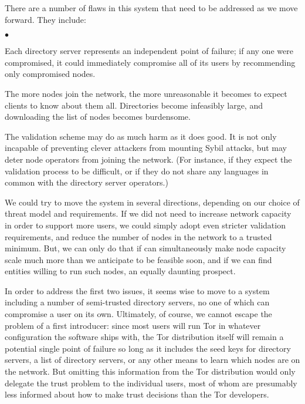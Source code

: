 \documentclass{llncs}
\newenvironment{tightlist}{\begin{list}{$\bullet$}{
  \setlength{\itemsep}{0mm}
    \setlength{\parsep}{0mm}
    }}{\end{list}}
\begin{document}
There are a number of flaws in this system that need to be addressed as we
move forward.  They include:
\begin{tightlist}
\item Each directory server represents an independent point of failure; if
  any one were compromised, it could immediately compromise all of its users
  by recommending only compromised nodes.
\item The more nodes join the network, the more unreasonable it
  becomes to expect clients to know about them all.  Directories
  become infeasibly large, and downloading the list of nodes becomes
  burdensome.
\item The validation scheme may do as much harm as it does good.  It is not
  only incapable of preventing clever attackers from mounting Sybil attacks,
  but may deter node operators from joining the network.  (For instance, if
  they expect the validation process to be difficult, or if they do not share
  any languages in common with the directory server operators.)
\end{tightlist}

We could try to move the system in several directions, depending on our
choice of threat model and requirements.  If we did not need to increase
network capacity in order to support more users, we could simply
 adopt even stricter validation requirements, and reduce the number of
nodes in the network to a trusted minimum.  
But, we can only do that if can simultaneously make node capacity
scale much more than we anticipate to be feasible soon, and if we can find
entities willing to run such nodes, an equally daunting prospect.


In order to address the first two issues, it seems wise to move to a system
including a number of semi-trusted directory servers, no one of which can
compromise a user on its own.  Ultimately, of course, we cannot escape the
problem of a first introducer: since most users will run Tor in whatever
configuration the software ships with, the Tor distribution itself will
remain a potential single point of failure so long as it includes the seed
keys for directory servers, a list of directory servers, or any other means
to learn which nodes are on the network.  But omitting this information
from the Tor distribution would only delegate the trust problem to the
individual users, most of whom are presumably less informed about how to make
trust decisions than the Tor developers.

\end{document}
